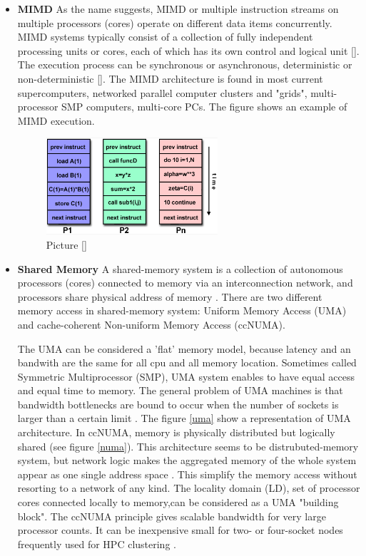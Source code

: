 \begin{itemize}
\item \textbf{MIMD} As the name suggests, MIMD or multiple instruction streams on multiple processors (cores) operate on different data items concurrently. MIMD systems typically consist of a collection of fully independent processing units or cores, each of which has its own control and logical unit []. The execution process can be synchronous or asynchronous, deterministic or non-deterministic []. The MIMD architecture is found in most current supercomputers, networked parallel computer clusters and "grids", multi-processor SMP computers, multi-core PCs. The figure  shows an example of MIMD execution.  
\begin{figure}[!h]
\centering 
\includegraphics[width=0.6\textwidth]{images/mimd.png}
\caption{Picture []}
\label{sim1} 
\end{figure}

\item \textbf{Shared Memory} A shared-memory system is a collection of autonomous processors (cores) connected to memory via an interconnection network, and processors share physical address of memory \cite{}. There are two different memory access in shared-memory system: Uniform Memory Access (UMA) and cache-coherent Non-uniform Memory Access (ccNUMA). 

The UMA can be considered a 'flat' memory model, because latency and an bandwith are the same for all cpu and all memory location. Sometimes called Symmetric Multiprocessor (SMP), UMA system  enables to have equal access and equal time to memory. The general problem of UMA machines is that bandwidth bottlenecks are bound to occur when the number of sockets is larger than a certain limit \cite{}. The figure \ref{uma} show a representation of UMA architecture. 
In ccNUMA, memory is physically distributed but logically shared (see figure \ref{numa}). This architecture seems to be distrubuted-memory system, but network logic makes the aggregated memory of the whole system appear as
one single address space \cite{}. This simplify the memory access without resorting to a network of any kind. The locality domain (LD), set of processor cores connected locally to memory,can be considered as a UMA "building block". The ccNUMA principle gives scalable bandwidth for very large processor counts. It can be inexpensive small for two- or four-socket nodes frequently used for HPC clustering \cite{}.


\end{itemize}
